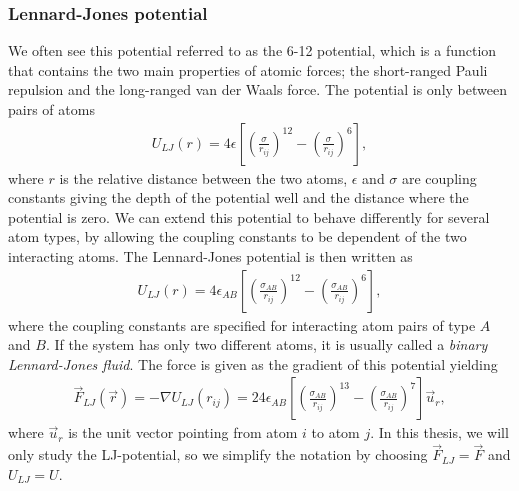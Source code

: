 \subsubsection{Lennard-Jones potential}
We often see this potential referred to as the 6-12 potential, which is a function that contains the two main properties of atomic forces; the short-ranged Pauli repulsion and the long-ranged van der Waals force. The potential is only between pairs of atoms
\begin{align}
	\label{eq:md_potential_energy}
	U_{LJ}(r) = 4\epsilon\left[\left(\frac{\sigma}{r_{ij}}\right)^{12} - \left(\frac{\sigma}{r_{ij}}\right)^{6}\right],
\end{align}
where $r$ is the relative distance between the two atoms, $\epsilon$ and $\sigma$ are coupling constants giving the depth of the potential well and the distance where the potential is zero. We can extend this potential to behave differently for several atom types, by allowing the coupling constants to be dependent of the two interacting atoms. The Lennard-Jones potential is then written as
\begin{align}
	U_{LJ}(r) = 4\epsilon_{AB}\left[\left(\frac{\sigma_{AB}}{r_{ij}}\right)^{12} - \left(\frac{\sigma_{AB}}{r_{ij}}\right)^{6}\right],
\end{align}
where the coupling constants are specified for interacting atom pairs of type $A$ and $B$. If the system has only two different atoms, it is usually called a \textit{binary Lennard-Jones fluid}. The force is given as the gradient of this potential yielding 
\begin{align*}
	\vec F_{LJ}(\vec{r}) = -\nabla U_{LJ}(r_{ij}) = 24\epsilon_{AB}\left[\left(\frac{\sigma_{AB}}{r_{ij}}\right)^{13} - \left(\frac{\sigma_{AB}}{r_{ij}}\right)^{7}\right]\vec u_r,
\end{align*}
where $\vec u_r$ is the unit vector pointing from atom $i$ to atom $j$. In this thesis, we will only study the LJ-potential, so we simplify the notation by choosing $\vec F_{LJ} = \vec F$ and $U_{LJ} = U$.
